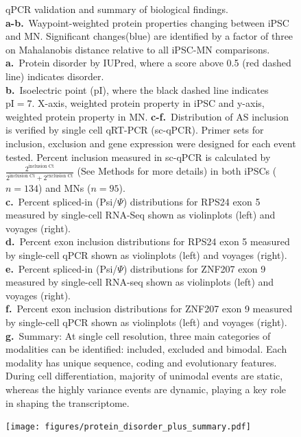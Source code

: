 \clearpage
\thispagestyle{facingcaption}
\begin{figure}[h]
\captionsetup{labelformat=prev-page}
\caption[qPCR validation and summary of biological findings.]{qPCR validation and summary of biological findings.\\
\textbf{a-b.}~Waypoint-weighted protein properties changing between iPSC and MN. Significant changes(blue) are identified by a factor of three on Mahalanobis distance relative to all iPSC-MN comparisons.\\
\textbf{a.}~Protein disorder by IUPred, where a score above 0.5 (red dashed line) indicates disorder.\\
\textbf{b.}~Isoelectric point (pI), where the black dashed line indicates $\text{pI}=7$. X-axis, weighted protein property in iPSC and y-axis, weighted protein property in MN.
\textbf{c-f.}~Distribution of AS inclusion is verified by single cell qRT-PCR (sc-qPCR). Primer sets for inclusion, exclusion and gene expression were designed for each event tested. Percent inclusion measured in sc-qPCR is calculated by $\frac{2^{\text{inclusion Ct}}}{2^{\text{inclusion Ct}} + 2^{\text{exclusion Ct}}}$ (See Methods for more details) in both iPSCs ($n =134$) and MNs ($n = 95$). \\
\textbf{c.}~Percent spliced-in (Psi/$\Psi$) distributions for RPS24 exon 5 measured by single-cell RNA-Seq shown as violinplots (left) and voyages (right).\\
\textbf{d.}~Percent exon inclusion distributions for RPS24 exon 5 measured by single-cell qPCR shown as violinplots (left) and voyages (right).\\
\textbf{e.}~Percent spliced-in (Psi/$\Psi$) distributions for ZNF207 exon 9 measured by single-cell RNA-seq shown as violinplots (left) and voyages (right).\\
\textbf{f.}~Percent exon inclusion distributions for ZNF207 exon 9 measured by single-cell qPCR shown as violinplots (left) and voyages (right).\\
\textbf{g.}~Summary: At single cell resolution, three main categories of modalities can be identified: included, excluded and bimodal. Each modality has unique sequence, coding and evolutionary features. During cell differentiation, majority of unimodal events are static, whereas the highly variance events are dynamic, playing a key role in shaping the transcriptome.
}
\label{fig:protein_disorder_plus_summary}
\end{figure}
\clearpage
\begin{figure}[h]
\ContinuedFloat
\captionsetup{labelformat=empty}
\centering
\texttt{[image: figures/protein\_disorder\_plus\_summary.pdf]}
\end{figure}
\clearpage




